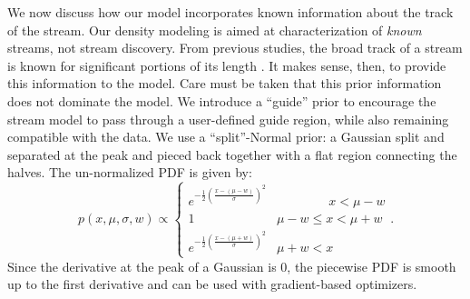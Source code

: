 \documentclass[twocolumn, linenumbers]{aastex631}
\newcommand{\Exp}[1]{e^{#1}}
\newcommand{\pdf}{p}
\begin{document}
            We now discuss how our model incorporates known information about
            the track of the stream.  Our density modeling is aimed at
            characterization of \textit{known} streams, not stream discovery.
            From previous studies, the broad track of a stream is known for
            significant portions of its length \citep[e.g. see the atlas
            in][]{Mateu2022}. It makes sense, then, to provide this information
            to the model. Care must be taken that this prior information does
            not dominate the model.  We introduce a ``guide'' prior to encourage
            the stream model to pass through a user-defined guide region, while
            also remaining compatible with the data.  We use a ``split''-Normal
            prior: a Gaussian split and separated at the peak and pieced back
            together with a flat region connecting the halves.  The
            un-normalized PDF is given by:
            \begin{equation}
                \pdf(x,\mu,\sigma,w) \propto \begin{cases} 
                   \Exp{-\frac{1}{2}\left(\frac{x-(\mu-w)}{\sigma}\right)^2} & \phantom{\mu - w <}\ x < \mu - w \\
                    1 & \mu - w \leq x < \mu + w \\
                    \Exp{-\frac{1}{2}\left(\frac{x-(\mu+w)}{\sigma}\right)^2} & \mu + w < x
                \end{cases}.
            \end{equation}
            Since the derivative at the peak of a Gaussian is $0$, the piecewise
            PDF is smooth up to the first derivative and can be used with
            gradient-based optimizers.
\end{document}
